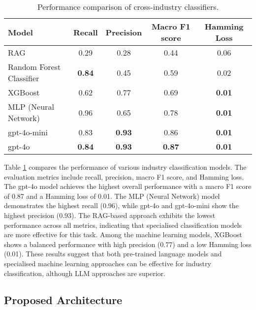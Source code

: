 \begin{table}[H]
\centering
\begin{tabular}{lcccc}
\hline
Model                    & Recall & Precision & Macro F1 score & Hamming Loss \\ \hline
RAG                      & 0.29   & 0.28      & 0.44     & 0.06         \\
Random Forest Classifier & \textbf{0.84}   & 0.45      & 0.59     & 0.02         \\
XGBoost                  & 0.62   & 0.77      & 0.69     & \textbf{0.01}         \\
MLP (Neural Network)     & 0.96   & 0.65      & 0.78     & \textbf{0.01}         \\
gpt-4o-mini              & 0.83   & \textbf{0.93}      & 0.86     & \textbf{0.01}         \\
gpt-4o                   & \textbf{0.84}   & \textbf{0.93}      & \textbf{0.87}     & \textbf{0.01}    \\ \hline     
\end{tabular}
\caption{Performance comparison of cross-industry classifiers.}
\label{tab:industry-classifiers}
\end{table}

Table \ref{tab:industry-classifiers} compares the performance of various industry classification models. The evaluation metrics include recall, precision, macro F1 score, and Hamming loss. The gpt-4o model achieves the highest overall performance with a macro F1 score of 0.87 and a Hamming loss of 0.01. The MLP (Neural Network) model demonstrates the highest recall (0.96), while gpt-4o and gpt-4o-mini show the highest precision (0.93). The RAG-based approach exhibits the lowest performance across all metrics, indicating that specialised classification models are more effective for this task. Among the machine learning models, XGBoost shows a balanced performance with high precision (0.77) and a low Hamming loss (0.01). These results suggest that both pre-trained language models and specialised machine learning approaches can be effective for industry classification, although LLM approaches are superior.

\subsection{Proposed Architecture}

